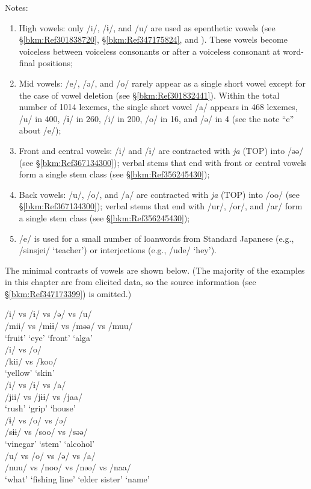 Notes:
\begin{enumerate}[label=\alph*.]
\item High vowels: only /i/, /ɨ/, and /u/ are used as epenthetic vowels (see §\ref{bkm:Ref301838720}, §\ref{bkm:Ref347175824}, and ). These vowels become voiceless between voiceless consonants or after a voiceless consonant at word-final positions;
\item \label{bkm:Ref347176670}Mid vowels: /e/, /ə/, and /o/ rarely appear as a single short vowel except for the case of vowel deletion (see §\ref{bkm:Ref301832441}). Within the total number of 1014 lexemes, the single short vowel /a/ appears in 468 lexemes, /u/ in 400, /ɨ/ in 260, /i/ in 200, /o/ in 16, and /ə/ in 4 (see the note “e” about /e/);
\item Front and central vowels: /i/ and /ɨ/ are contracted with \textit{ja} (TOP) into /əə/ (see §\ref{bkm:Ref367134300}); verbal stems that end with front or central vowels form a single stem class (see §\ref{bkm:Ref356245430});
\item Back vowels: /u/, /o/, and /a/ are contracted with \textit{ja} (TOP) into /oo/ (see §\ref{bkm:Ref367134300}); verbal stems that end with /ur/, /or/, and /ar/ form a single stem class (see §\ref{bkm:Ref356245430});
\item /e/ is used for a small number of loanwords from Standard Japanese (e.g., /sinsjei/ ‘teacher’) or interjections (e.g., /ude/ ‘hey’).
\end{enumerate}

The minimal contrasts of vowels are shown below. (The majority of the examples in this chapter are from elicited data, so the source information (see §\ref{bkm:Ref347173399}) is omitted.)

\ea 
\ea /i/ vs /ɨ/ vs /ə/ vs /u/\\
 /mii/  vs  /mɨɨ/  vs  /məə/  vs  /muu/\\
 ‘fruit’ {} ‘eye’ {}  ‘front’ {}  ‘alga’\\
\ex /i/ vs /o/\\
/kii/  vs  /koo/\\
‘yellow’ {}  ‘skin’\\
\ex /i/ vs /ɨ/ vs /a/\\
/jii/  vs  /jɨɨ/  vs  /jaa/\\
‘rush’ {}  ‘grip’ {}  ‘house’\\
\ex /ɨ/ vs /o/ vs /ə/\\
/sɨɨ/  vs  /soo/  vs  /səə/\\
‘vinegar’ {}  ‘stem’ {}  ‘alcohol’\\
\ex /u/ vs /o/ vs /ə/ vs /a/\\
/nuu/  vs  /noo/  vs  /nəə/  vs  /naa/\\
‘what’ {}  ‘fishing line’ {}  ‘elder sister’ {}  ‘name’\\
\z
\z

